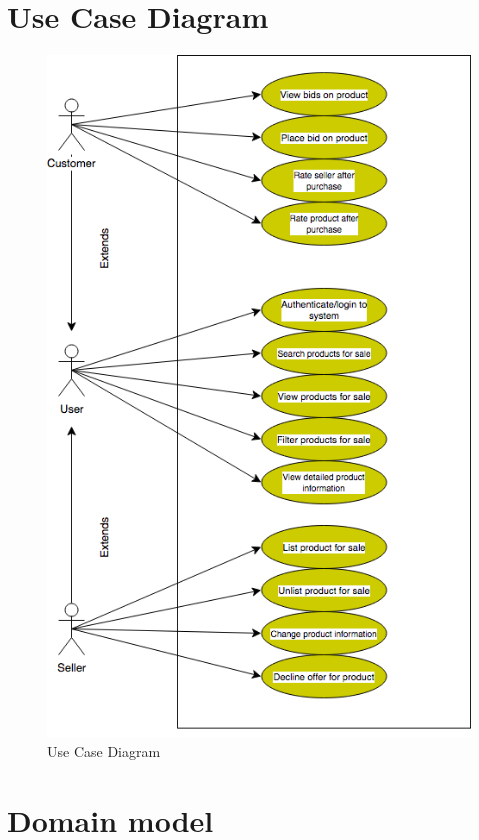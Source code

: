 
\section{Use Case Diagram}

\begin{figure}[H]
  \caption{Use Case Diagram}
  \centering
    \includegraphics[scale=0.8]{figures/Use-Case}
\end{figure}

\section{Domain model}


